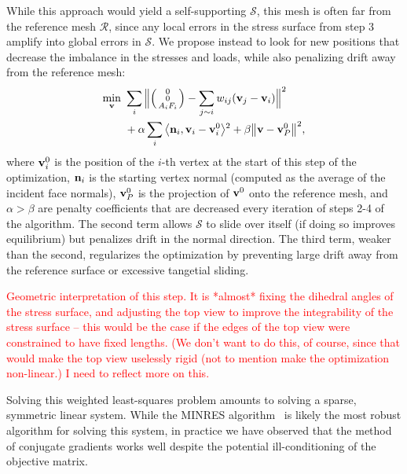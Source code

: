 \documentclass[annual]{acmsiggraph}
\makeatletter
\def\<{\mathchoice{\big\langle}{\langle}{\langle}{\langle}}
\def\>{\mathchoice{\big\rangle}{\rangle}{\rangle}{\rangle}}
\def\Forcevector{\Big(\mbox{\scriptsize
	\def\arraystretch{0.8}\begin{tabular}{@{\,}c@{\,}}
	0 \\ 0 \\ $A_i F_i$
	\end{tabular}}\Big)}
\def\SS{{\mathcal S}}
\def\RR{{\mathcal R}}
\newcommand{\todo}[1]{\textcolor{red}{#1}}
\makeatother
\begin{document}
While this approach would yield a self-supporting $\SS$, this mesh is 
often far from the reference mesh $\RR$, since any local errors in the 
stress surface from step 3 amplify into global errors in $\SS$. We propose 
instead to look for new positions that decrease the imbalance in the 
stresses and loads, while also penalizing drift away from the reference 
mesh:
	\begin{align*}
	\min_{\vw}
	\ &
	\sum_i \Big\|
		\Forcevector -
		\sum_{j\sim i} w_{ij} (\vw_j - \vw_i)
		\Big\|^2 
	\\ &
	+ \alpha \sum_i 
		\<\nw_i, \vw_i - \vw^0_i \>^2 
		+ \beta \big\|\vw - \vw^0_P\big\|^2,
\end{align*}
 where ${\mathbf v}^0_i$ is the position of the $i$-th vertex at the start of this 
step of the optimization, ${\mathbf n}_i$ is the starting vertex normal (computed 
as the average of the incident face normals), ${\mathbf v}^0_P$ is the projection 
of ${\mathbf v}^0$ onto the reference mesh, and $\alpha > \beta$ are penalty 
coefficients that are decreased every iteration of steps 2-4 of the 
algorithm. The second term allows $\SS$ to slide over itself (if doing so 
improves equilibrium) but penalizes drift in the normal direction. The 
third term, weaker than the second, regularizes the optimization by 
preventing large drift away from the reference surface or excessive 
tangetial sliding.

\todo{Geometric interpretation of this step. It is *almost* fixing the 
dihedral angles of the stress surface, and adjusting the top view to 
improve the integrability of the stress surface -- this would be the case 
if the edges of the top view were constrained to have fixed lengths. (We 
don't want to do this, of course, since that would make the top view 
uselessly rigid (not to mention make the optimization non-linear.) I need 
to reflect more on this.}

Solving this weighted least-squares problem amounts to solving a sparse, 
symmetric linear system. While the MINRES algorithm~\cite{paige75} is likely 
the most robust algorithm for solving this system, in practice we have 
observed that the method of conjugate gradients works well despite the 
potential ill-conditioning of the objective matrix.
\end{document}
